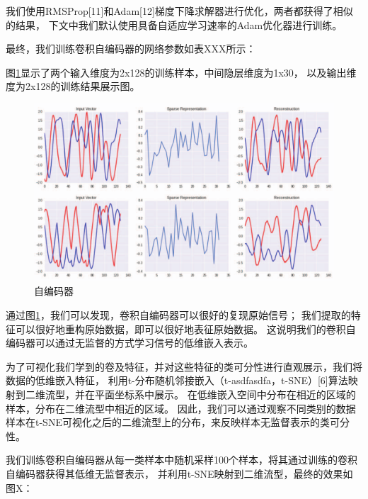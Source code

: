 我们使用RMSProp[11]和Adam[12]梯度下降求解器进行优化，两者都获得了相似的结果，
下文中我们默认使用具备自适应学习速率的Adam优化器进行训练。\par

最终，我们训练卷积自编码器的网络参数如表XXX所示：

图\ref{sec:fig_3_4}显示了两个输入维度为2x128的训练样本，中间隐层维度为1x30，
以及输出维度为2x128的训练结果展示图。\par
\begin{figure}[!h]
	\centering
	\includegraphics[scale=0.2]{figures/chapter_3/examples_cae}
	\caption{自编码器}	\label{sec:fig_3_4}
\end{figure} 

通过图\ref{sec:fig_3_4}，我们可以发现，卷积自编码器可以很好的复现原始信号；
我们提取的特征可以很好地重构原始数据，即可以很好地表征原始数据。
这说明我们的卷积自编码器可以通过无监督的方式学习信号的低维嵌入表示。\par

为了可视化我们学到的卷及特征，并对这些特征的类可分性进行直观展示，我们将数据的低维嵌入特征，
利用t-分布随机邻接嵌入（t-asdfasdfa，t-SNE）[6]算法映射到二维流型，并在平面坐标系中展示。
在低维嵌入空间中分布在相近的区域的样本，分布在二维流型中相近的区域。
因此，我们可以通过观察不同类别的数据样本在t-SNE可视化之后的二维流型上的分布，来反映样本无监督表示的类可分性。\par

我们训练卷积自编码器从每一类样本中随机采样100个样本，将其通过训练的卷积自编码器获得其低维无监督表示，
并利用t-SNE映射到二维流型，最终的效果如图X：\par

